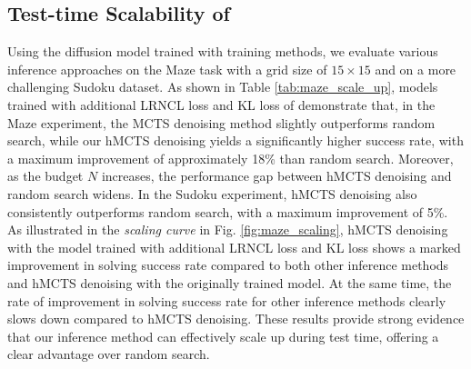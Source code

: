 \subsection{Test-time Scalability of \proj}
\label{sec:scale_up}
Using the diffusion model trained with \proj training methods, we evaluate various inference approaches on the Maze task with a grid size of $15\times15$ and on a more challenging Sudoku dataset. As shown in Table \ref{tab:maze_scale_up}, models trained with additional LRNCL loss and KL loss of \proj demonstrate that, in the Maze experiment, the MCTS denoising method slightly outperforms random search, while our hMCTS denoising yields a significantly higher success rate, with a maximum improvement of approximately 18\% than random search. Moreover, as the budget $N$ increases, the performance gap between hMCTS denoising and random search widens. In the Sudoku experiment, hMCTS denoising also consistently outperforms random search, with a maximum improvement of 5\%. As illustrated in the \emph{scaling curve} in Fig. \ref{fig:maze_scaling}, hMCTS denoising with the model trained with additional LRNCL loss and KL loss shows a marked improvement in solving success rate compared to both other inference methods and hMCTS denoising with the originally trained model. At the same time, the rate of improvement in solving success rate for other inference methods clearly slows down compared to hMCTS denoising. These results provide strong evidence that our inference method can effectively scale up during test time, offering a clear advantage over random search.